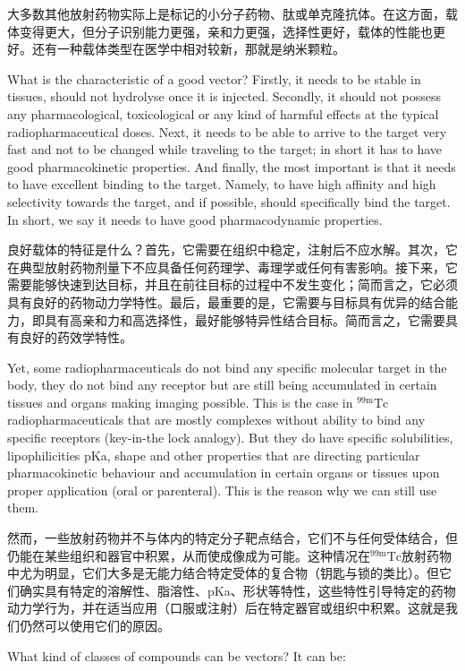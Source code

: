 \documentclass[dvipsnames, svgnames,a4paper,11pt]{article}
\begin{document}
大多数其他放射药物实际上是标记的小分子药物、肽或单克隆抗体。在这方面，载体变得更大，但分子识别能力更强，亲和力更强，选择性更好，载体的性能也更好。还有一种载体类型在医学中相对较新，那就是纳米颗粒。


What is the characteristic of a good vector? Firstly, it needs to be stable in tissues,
should not hydrolyse once it is injected. Secondly, it should not possess any
pharmacological, toxicological or any kind of harmful effects at the typical
radiopharmaceutical doses. Next, it needs to be able to arrive to the target very fast
and not to be changed while traveling to the target; in short it has to have good
pharmacokinetic properties. And finally, the most important is that it needs to have
excellent binding to the target. Namely, to have high affinity and high selectivity
towards the target, and if possible, should specifically bind the target. In short, we
say it needs to have good pharmacodynamic properties.

良好载体的特征是什么？首先，它需要在组织中稳定，注射后不应水解。其次，它在典型放射药物剂量下不应具备任何药理学、毒理学或任何有害影响。接下来，它需要能够快速到达目标，并且在前往目标的过程中不发生变化；简而言之，它必须具有良好的药物动力学特性。最后，最重要的是，它需要与目标具有优异的结合能力，即具有高亲和力和高选择性，最好能够特异性结合目标。简而言之，它需要具有良好的药效学特性。


Yet, some radiopharmaceuticals do not bind any specific molecular target in the
body, they do not bind any receptor but are still being accumulated in certain tissues
and organs making imaging possible. This is the case in ${}^\mathrm{99m}\mathrm{Tc}$ radiopharmaceuticals
that are mostly complexes without ability to bind any specific receptors (key-in-the
lock analogy). But they do have specific solubilities, lipophilicities pKa, shape and
other properties that are directing particular pharmacokinetic behaviour and
accumulation in certain organs or tissues upon proper application (oral or parenteral).
This is the reason why we can still use them.

然而，一些放射药物并不与体内的特定分子靶点结合，它们不与任何受体结合，但仍能在某些组织和器官中积累，从而使成像成为可能。这种情况在${}^\mathrm{99m}\mathrm{Tc}$放射药物中尤为明显，它们大多是无能力结合特定受体的复合物（钥匙与锁的类比）。但它们确实具有特定的溶解性、脂溶性、pKa、形状等特性，这些特性引导特定的药物动力学行为，并在适当应用（口服或注射）后在特定器官或组织中积累。这就是我们仍然可以使用它们的原因。

What kind of classes of compounds can be vectors? It can be:
\end{document}
